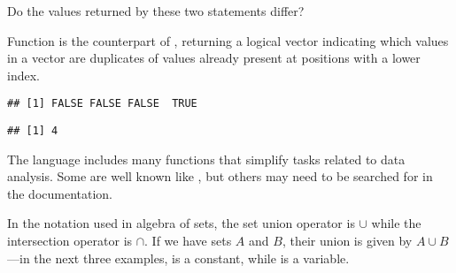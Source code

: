 \documentclass[krantz2]{krantz}\usepackage{knitr}
\begin{document}
\begin{playground}
  Do the values returned by these two statements differ?

\begin{knitrout}\footnotesize
{}\color{fgcolor}
\end{knitrout}

\end{playground}

\begin{explainbox}
Function  is the counterpart of , returning a logical vector indicating which values in a vector are duplicates of values already present at positions with a lower index.

\begin{knitrout}\footnotesize
{}\color{fgcolor}\begin{kframe}
\begin{alltt}
\end{alltt}
\begin{verbatim}
## [1] FALSE FALSE FALSE  TRUE
\end{verbatim}
\begin{alltt}
\end{alltt}
\begin{verbatim}
## [1] 4
\end{verbatim}
\end{kframe}
\end{knitrout}

The \Rlang language includes many functions that simplify tasks related to data analysis. Some are well known like , but others may need to be searched for in the documentation.
\end{explainbox}

In the notation used in algebra of sets, the set union operator is $\cup$ while the intersection operator is $\cap$. If we have sets $A$ and $B$, their union is given by $A \cup B$---in the next three examples,  is a constant, while  is a variable.
\end{document}
